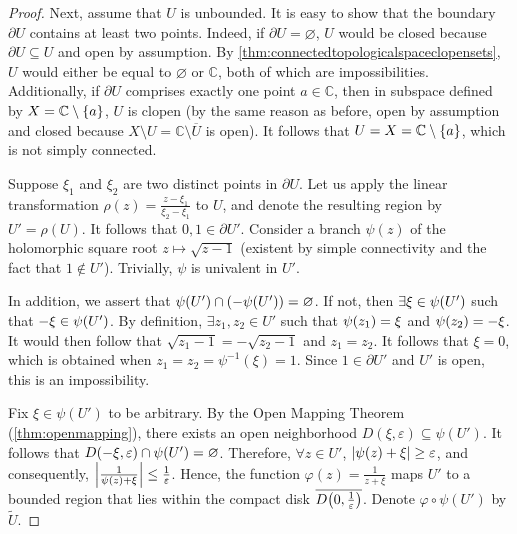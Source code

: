 \begin{proof}
    Next, assume that \(U\) is unbounded. It is easy to show that the boundary \(\partial U\) contains at least two points. Indeed, if \(\partial U=\varnothing\), \(U\) would be closed because \(\partial U\subseteq U\) and open by assumption. By \cref{thm:connectedtopologicalspaceclopensets}, \(U\) would either be equal to \(\varnothing\) or \(\mathbb{C}\), both of which are impossibilities. Additionally, if \(\partial U\) comprises exactly one point \(a\in\mathbb{C}\), then in subspace defined by \(X=\mathbb{C}\setminus\cbraces{a}\), \(U\) is clopen (by the same reason as before, open by assumption and closed because \(X\setminus U=\mathbb{C}\setminus\overline{U}\) is open). It follows that \(U=X=\mathbb{C}\setminus\cbraces{a}\), which is not simply connected.

    Suppose \(\xi_1\) and \(\xi_2\) are two distinct points in \(\partial U\). Let us apply the linear transformation \(\rho(z)=\frac{z-\xi_1}{\xi_2-\xi_1}\) to \(U\), and denote the resulting region by \(U'=\rho(U)\). It follows that \(0,1\in\partial U'\). Consider a branch \(\psi(z)\) of the holomorphic square root \(z\mapsto\sqrt{z-1}\) (existent by simple connectivity and the fact that \(1\notin U'\)). Trivially, \(\psi\) is univalent in \(U'\).

    In addition, we assert that \(\psi\qty(U')\cap\qty(-\psi\qty(U'))=\varnothing\). If not, then \(\exists \xi\in \psi\qty(U')\) such that \(-\xi\in\psi\qty(U')\). By definition, \(\exists z_1,z_2\in U'\) such that \(\psi\qty(z_1)=\xi\) and \(\psi\qty(z_2)=-\xi\). It would then follow that \(\sqrt{z_1-1}=-\sqrt{z_2-1}\) and \(z_1=z_2\). It follows that \(\xi=0\), which is obtained when \(z_1=z_2=\psi^{-1}(\xi)=1\). Since \(1\in\partial U'\) and \(U'\) is open, this is an impossibility.

    Fix \(\xi\in\psi(U')\) to be arbitrary. By the Open Mapping Theorem (\cref{thm:openmapping}), there exists an open neighborhood \(D(\xi,\varepsilon)\subseteq \psi(U')\). It follows that \(D\qty(-\xi,\varepsilon)\cap\psi\qty(U')=\varnothing\). Therefore, \(\forall z\in U'\), \(\abs{\psi(z)+\xi}\geq\varepsilon\), and consequently, \(\abs{\frac{1}{\psi(z)+\xi}}\leq\frac{1}{\varepsilon}\). Hence, the function \(\varphi(z)=\frac{1}{z+\xi}\) maps \(U'\) to a bounded region that lies within the compact disk \(\overline{D\qty(0,\frac{1}{\varepsilon})}\). Denote \(\varphi\circ\psi(U')\) by \(\widetilde{U}\).


\end{proof}
